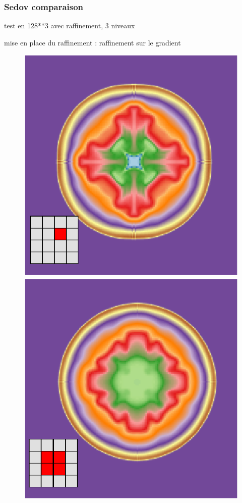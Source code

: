\subsubsection{Sedov comparaison}

test en 128**3 avec raffinement, 3 niveaux

mise en place du raffinement :
raffinement sur le gradient 


\begin{figure}[bth]
        \includegraphics[width=.95\linewidth]{img/03/sedov/slice_therm1.pdf} 
		\includegraphics[width=.95\linewidth]{img/03/sedov/slice_therm4.pdf} 

\end{figure}
